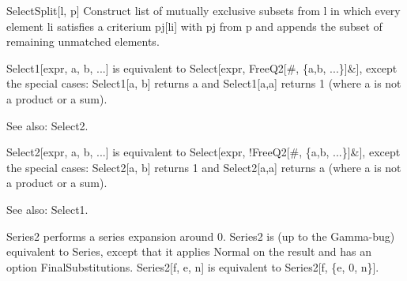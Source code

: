 






SelectSplit[l, p] Construct list of mutually exclusive subsets from l in which every element li satisfies a criterium pj[li] with pj from
  p and appends the subset of remaining unmatched elements.








Select1[expr, a, b, ...] is equivalent to Select[expr, FreeQ2[\#{}, \{a,b, ...\}]\&{}], except the special cases: Select1[a, b] returns a
  and Select1[a,a] returns 1 (where a is not a product or a sum).

See also:  Select2.



Select2[expr, a, b, ...] is equivalent to Select[expr, !FreeQ2[\#{}, \{a,b, ...\}]\&{}], except the special cases: Select2[a, b] returns
  1 and { }Select2[a,a] returns a (where a is not a product or a sum).

See also:  Select1.



 Series2 performs a series expansion around 0. Series2 is (up to the Gamma-bug) equivalent to Series, except that it applies Normal on
  the result and has an option FinalSubstitutions. Series2[f, e, n] is equivalent to Series2[f, \{e, 0, n\}].



